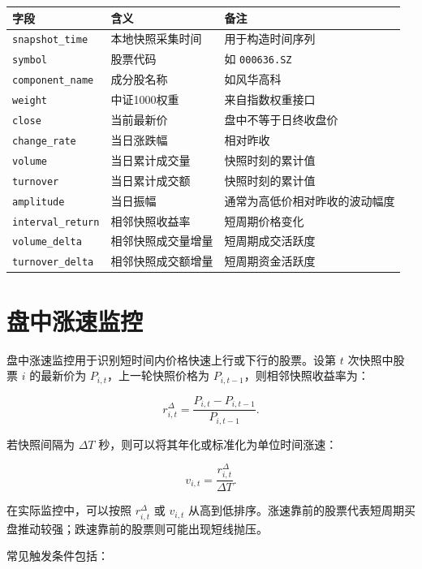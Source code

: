 \documentclass[UTF8,a4paper,12pt]{ctexart}
\begin{document}
\begin{longtable}{lll}
\toprule
字段 & 含义 & 备注 \\
\midrule
\endhead
\texttt{snapshot\_time} & 本地快照采集时间 & 用于构造时间序列 \\
\texttt{symbol} & 股票代码 & 如 \texttt{000636.SZ} \\
\texttt{component\_name} & 成分股名称 & 如风华高科 \\
\texttt{weight} & 中证1000权重 & 来自指数权重接口 \\
\texttt{close} & 当前最新价 & 盘中不等于日终收盘价 \\
\texttt{change\_rate} & 当日涨跌幅 & 相对昨收 \\
\texttt{volume} & 当日累计成交量 & 快照时刻的累计值 \\
\texttt{turnover} & 当日累计成交额 & 快照时刻的累计值 \\
\texttt{amplitude} & 当日振幅 & 通常为高低价相对昨收的波动幅度 \\
\texttt{interval\_return} & 相邻快照收益率 & 短周期价格变化 \\
\texttt{volume\_delta} & 相邻快照成交量增量 & 短周期成交活跃度 \\
\texttt{turnover\_delta} & 相邻快照成交额增量 & 短周期资金活跃度 \\
\bottomrule
\end{longtable}

\section{盘中涨速监控}

盘中涨速监控用于识别短时间内价格快速上行或下行的股票。设第 $t$ 次快照中股票 $i$ 的最新价为 $P_{i,t}$，上一轮快照价格为 $P_{i,t-1}$，则相邻快照收益率为：

\begin{equation}
r_{i,t}^{\Delta} = \frac{P_{i,t} - P_{i,t-1}}{P_{i,t-1}}.
\end{equation}

若快照间隔为 $\Delta T$ 秒，则可以将其年化或标准化为单位时间涨速：

\begin{equation}
v_{i,t} = \frac{r_{i,t}^{\Delta}}{\Delta T}.
\end{equation}

在实际监控中，可以按照 $r_{i,t}^{\Delta}$ 或 $v_{i,t}$ 从高到低排序。涨速靠前的股票代表短周期买盘推动较强；跌速靠前的股票则可能出现短线抛压。

常见触发条件包括：
\end{document}
